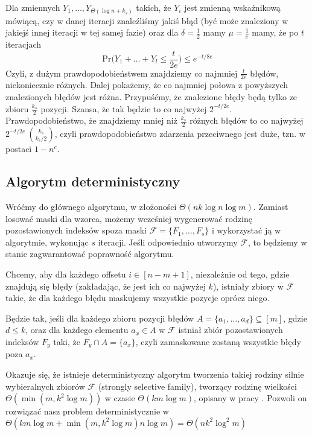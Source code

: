 \documentclass[a4paper,12pt]{article}
\theoremstyle{definition}
\begin{document}
Dla zmiennych $Y_1, \dots, Y_{\Theta(\log n + k_s)}$ takich, że $Y_\iota$ jest zmienną wskaźnikową mówiącą, czy w danej iteracji znaleźliśmy jakiś błąd (być może znaleziony w jakiejś innej iteracji w tej samej fazie) oraz dla $\delta = \frac{1}{2}$ mamy $\mu = \frac{1}{e}$ mamy, że po $t$ iteracjach
\[\text{Pr}\Big(Y_1 + \dots + Y_l \le \frac{t}{2e}\Big) \le e^{-t/{8e}}\]
Czyli, z dużym prawdopodobieństwem znajdziemy co najmniej $\frac{t}{2e}$ błędów, niekoniecznie różnych.
Dalej pokażemy, że co najmniej połowa z powyższych znalezionych błędów jest różna. Przypuśćmy, że znalezione błędy będą tylko ze zbioru $\frac{k_s}{2}$ pozycji. Szansa, że tak będzie to co najwyżej $2^{-t/2e}$. Prawdopodobieństwo, że znajdziemy mniej niż $\frac{k_s}{2}$ różnych błędów to co najwyżej $2^{-t/2e}\ \binom{k_s}{k_s/2}$, czyli prawdopodobieństwo zdarzenia przeciwnego jest duże, tzn. w postaci $1-n^c$.

\subsection{Algorytm deterministyczny}
Wróćmy do głównego algorytmu, w złożoności $\Theta(nk\log n \log m)$. Zamiast losować maski dla wzorca, możemy wcześniej wygenerować rodzinę pozostawionych indeksów spoza maski $\mathcal F = \{F_1, \dots, F_s\}$ i wykorzystać ją w algorytmie, wykonując $s$ iteracji. Jeśli odpowiednio utworzymy $\mathcal F$, to będziemy w stanie zagwarantować poprawność algorytmu. 

Chcemy, aby dla każdego offsetu $i \in[n-m+1]$, niezależnie od tego, gdzie znajdują się błędy (zakładając, że jest ich co najwyżej $k$), istniały zbiory w $\mathcal F$ takie, że dla każdego błędu maskujemy wszystkie pozycje oprócz niego.

Będzie tak, jeśli dla każdego zbioru pozycji błędów $A =\{a_1,\dots, a_d\} \subseteq [m]$, gdzie $d \le k$, oraz dla każdego elementu $a_x \in A$ w $\mathcal F$ istniał zbiór pozostawionych indeksów $F_y$ taki, że $F_y \cap A = \{a_x\}$, czyli zamaskowane zostaną wszystkie błędy poza $a_x$.

Okazuje się, że istnieje deterministyczny algorytm tworzenia takiej rodziny silnie wybieralnych zbiorów $\mathcal F$ (strongly selective family), tworzący rodzinę wielkości $\Theta(\min(m, k^2 \log m))$ w czasie $\Theta(km \log m)$, opisany w pracy \cite{group_testing_schemes}. Pozwoli on rozwiązać nasz problem deterministycznie w $\Theta(km \log m + \min(m,k^2 \log m) n \log m) = \Theta(nk^2\log^2 m)$
\end{document}
